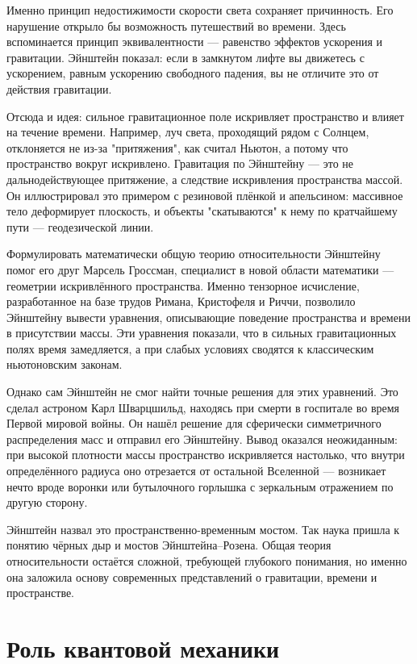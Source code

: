 Именно принцип недостижимости скорости света сохраняет причинность. Его нарушение открыло бы возможность путешествий во времени. Здесь вспоминается принцип эквивалентности --- равенство эффектов ускорения и гравитации. Эйнштейн показал: если в замкнутом лифте вы движетесь с ускорением, равным ускорению свободного падения, вы не отличите это от действия гравитации.

Отсюда и идея: сильное гравитационное поле искривляет пространство и влияет на течение времени. Например, луч света, проходящий рядом с Солнцем, отклоняется не из-за "притяжения", как считал Ньютон, а потому что пространство вокруг искривлено. Гравитация по Эйнштейну --- это не дальнодействующее притяжение, а следствие искривления пространства массой. Он иллюстрировал это примером с резиновой плёнкой и апельсином: массивное тело деформирует плоскость, и объекты "скатываются" к нему по кратчайшему пути --- геодезической линии.

Формулировать математически общую теорию относительности Эйнштейну помог его друг Марсель Гроссман, специалист в новой области математики --- геометрии искривлённого пространства. Именно тензорное исчисление, разработанное на базе трудов Римана, Кристофеля и Риччи, позволило Эйнштейну вывести уравнения, описывающие поведение пространства и времени в присутствии массы. Эти уравнения показали, что в сильных гравитационных полях время замедляется, а при слабых условиях сводятся к классическим ньютоновским законам.

Однако сам Эйнштейн не смог найти точные решения для этих уравнений. Это сделал астроном Карл Шварцшильд, находясь при смерти в госпитале во время Первой мировой войны. Он нашёл решение для сферически симметричного распределения масс и отправил его Эйнштейну. Вывод оказался неожиданным: при высокой плотности массы пространство искривляется настолько, что внутри определённого радиуса оно отрезается от остальной Вселенной --- возникает нечто вроде воронки или бутылочного горлышка с зеркальным отражением по другую сторону.

Эйнштейн назвал это пространственно-временным мостом. Так наука пришла к понятию чёрных дыр и мостов Эйнштейна–Розена. Общая теория относительности остаётся сложной, требующей глубокого понимания, но именно она заложила основу современных представлений о гравитации, времени и пространстве.

\section{Роль квантовой механики}

